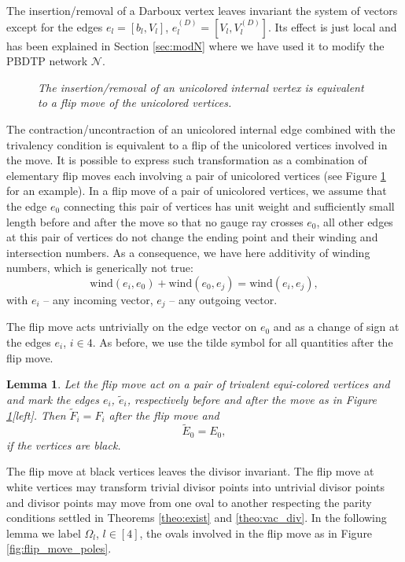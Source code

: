 \documentclass[11pt]{amsart}
\theoremstyle{plain}
\numberwithin{equation}{section}
\newtheorem{lemma}[theorem]{Lemma}
\begin{document}
The insertion/removal of a Darboux vertex leaves invariant the system of vectors except for the edges $e_{l}=[b_l, V_l]$, $e^{(D)}_l=[V_l, V^{(D)}_l]$. Its effect is just local and has been explained in Section \ref{sec:modN} where we have used it to modify the PBDTP network $\mathcal N$. 

\begin{figure}%
  \caption{\small{\sl The insertion/removal of an unicolored internal vertex is equivalent to a flip move of the unicolored vertices.}\label{fig:flipmove}}
\end{figure}

The contraction/uncontraction of an unicolored internal edge combined with the trivalency condition is equivalent to a flip of the unicolored vertices involved in the move. It is possible to express such transformation as a combination of elementary flip moves each involving a pair of unicolored vertices (see Figure \ref{fig:flipmove} for an example). In a flip move of a pair of unicolored vertices, we assume that the edge $e_0$ connecting this pair of vertices has unit weight and sufficiently small length before and after the move so that no gauge ray crosses $e_0$, all other edges at this pair of vertices do not change the ending point and their winding and intersection numbers. As a consequence, we have here additivity of winding numbers, which is generically not true:
$$
\mbox{wind} (e_i,e_0)+ \mbox{wind} (e_0,e_j) = \mbox{wind} (e_i,e_j),
$$
with $e_i$ -- any incoming vector, $e_j$ -- any outgoing vector.


The flip move acts untrivially on the edge vector on $e_0$ and as a change of sign at the edges $e_i$, $i \in 4$. As before, we use the tilde symbol for all quantities after the flip move.

\begin{lemma} Let the flip move act on a pair of trivalent equi-colored vertices and and mark the edges $e_i$, ${\tilde e}_i$, respectively before and after the move as in Figure \ref{fig:flipmove}[left]. Then ${\tilde F}_i = F_i$ after the flip move and 
\begin{equation}\label{eq:flip2}
{\tilde E}_0 = E_0,
\end{equation}
if the vertices are black.
\end{lemma}


The flip move at black vertices leaves the divisor invariant. The flip move at white vertices may transform trivial divisor points into untrivial divisor points and divisor points may move from one oval to another respecting the parity conditions 
settled in Theorems \ref{theo:exist} and \ref{theo:vac_div}.
In the following lemma we label $\Omega_l$, $l\in [4]$, the ovals involved in the flip move as in Figure \ref{fig:flip_move_poles}. 
\end{document}
